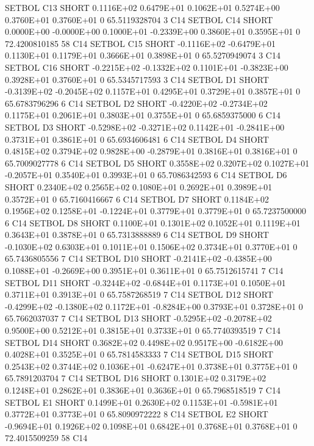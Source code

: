 \documentclass[twoside,11pt,nolof]{starlink}
\begin{document}
\begin{landscape}
\begin{small}
\begin{terminalv}
{{{{{ SETBOL C13 SHORT     0.1116E+02  0.6479E+01  0.1062E+01  0.5274E+00  0.3760E+01  0.3760E+01  0  65.5119328704   3 C14
 SETBOL C14 SHORT     0.0000E+00 -0.0000E+00  0.1000E+01 -0.2339E+00  0.3860E+01  0.3595E+01  0  72.4200810185  58 C14
 SETBOL C15 SHORT    -0.1116E+02 -0.6479E+01  0.1130E+01  0.1179E+01  0.3666E+01  0.3898E+01  0  65.5270949074   3 C14
 SETBOL C16 SHORT    -0.2215E+02 -0.1332E+02  0.1101E+01 -0.3823E+00  0.3928E+01  0.3760E+01  0  65.5345717593   3 C14
 SETBOL D1  SHORT    -0.3139E+02 -0.2045E+02  0.1157E+01  0.4295E+01  0.3729E+01  0.3857E+01  0  65.6783796296   6 C14
 SETBOL D2  SHORT    -0.4220E+02 -0.2734E+02  0.1175E+01  0.2061E+01  0.3803E+01  0.3755E+01  0  65.6859375000   6 C14
 SETBOL D3  SHORT    -0.5298E+02 -0.3271E+02  0.1142E+01 -0.2841E+00  0.3731E+01  0.3861E+01  0  65.6934606481   6 C14
 SETBOL D4  SHORT     0.4815E+02  0.3794E+02  0.9828E+00 -0.2879E+01  0.3816E+01  0.3816E+01  0  65.7009027778   6 C14
 SETBOL D5  SHORT     0.3558E+02  0.3207E+02  0.1027E+01 -0.2057E+01  0.3540E+01  0.3993E+01  0  65.7086342593   6 C14
 SETBOL D6  SHORT     0.2340E+02  0.2565E+02  0.1080E+01  0.2692E+01  0.3989E+01  0.3572E+01  0  65.7160416667   6 C14
 SETBOL D7  SHORT     0.1184E+02  0.1956E+02  0.1258E+01 -0.1224E+01  0.3779E+01  0.3779E+01  0  65.7237500000   6 C14
 SETBOL D8  SHORT     0.1100E+01  0.1301E+02  0.1052E+01  0.1119E+01  0.3643E+01  0.3878E+01  0  65.7313888889   6 C14
 SETBOL D9  SHORT    -0.1030E+02  0.6303E+01  0.1011E+01  0.1506E+02  0.3734E+01  0.3770E+01  0  65.7436805556   7 C14
 SETBOL D10 SHORT    -0.2141E+02 -0.4385E+00  0.1088E+01 -0.2669E+00  0.3951E+01  0.3611E+01  0  65.7512615741   7 C14
 SETBOL D11 SHORT    -0.3244E+02 -0.6844E+01  0.1173E+01  0.1050E+01  0.3711E+01  0.3913E+01  0  65.7587268519   7 C14
 SETBOL D12 SHORT    -0.4299E+02 -0.1380E+02  0.1172E+01 -0.8284E+00  0.3793E+01  0.3728E+01  0  65.7662037037   7 C14
 SETBOL D13 SHORT    -0.5295E+02 -0.2078E+02  0.9500E+00  0.5212E+01  0.3815E+01  0.3733E+01  0  65.7740393519   7 C14
 SETBOL D14 SHORT     0.3682E+02  0.4498E+02  0.9517E+00 -0.6182E+00  0.4028E+01  0.3525E+01  0  65.7814583333   7 C14
 SETBOL D15 SHORT     0.2543E+02  0.3744E+02  0.1036E+01 -0.6247E+01  0.3738E+01  0.3775E+01  0  65.7891203704   7 C14
 SETBOL D16 SHORT     0.1301E+02  0.3179E+02  0.1248E+01  0.2862E+01  0.3836E+01  0.3636E+01  0  65.7968518519   7 C14
 SETBOL E1  SHORT     0.1499E+01  0.2630E+02  0.1153E+01 -0.5981E+01  0.3772E+01  0.3773E+01  0  65.8090972222   8 C14
 SETBOL E2  SHORT    -0.9694E+01  0.1926E+02  0.1098E+01  0.6842E+01  0.3768E+01  0.3768E+01  0  72.4015509259  58 C14
}}}}}
\end{terminalv}
\end{small}
\end{landscape}
\end{document}
